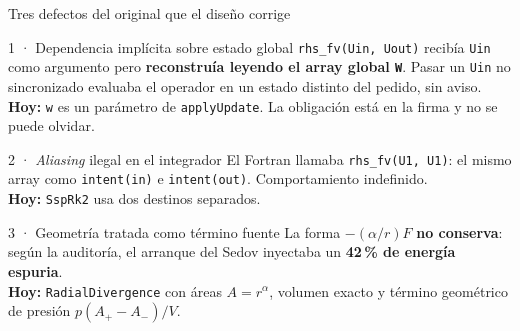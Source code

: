 \documentclass[aspectratio=169,10pt]{beamer}
\newcommand{\cod}[1]{\texttt{\small #1}}
\begin{document}
\begin{frame}[shrink]{Tres defectos del original que el diseño corrige}
  \small

  \begin{block}{1 · Dependencia implícita sobre estado global}
    \cod{rhs\_fv(Uin, Uout)} recibía \cod{Uin} como argumento pero
    \textbf{reconstruía leyendo el array global \cod{W}}. Pasar un \cod{Uin} no
    sincronizado evaluaba el operador en un estado distinto del pedido, sin aviso.
    \\[2pt]
    \textbf{Hoy:} \cod{w} es un parámetro de \cod{applyUpdate}. La obligación está
    en la firma y no se puede olvidar.
  \end{block}

  \begin{block}{2 · \emph{Aliasing} ilegal en el integrador}
    El Fortran llamaba \cod{rhs\_fv(U1, U1)}: el mismo array como \cod{intent(in)}
    e \cod{intent(out)}. Comportamiento indefinido.
    \\[2pt]
    \textbf{Hoy:} \cod{SspRk2} usa dos destinos separados.
  \end{block}

  \begin{block}{3 · Geometría tratada como término fuente}
    La forma $-(\alpha/r)F$ \textbf{no conserva}: según la auditoría, el arranque
    del Sedov inyectaba un \textbf{42\,\% de energía espuria}.
    \\[2pt]
    \textbf{Hoy:} \cod{RadialDivergence} con áreas $A=r^{\alpha}$, volumen exacto
    y término geométrico de presión $p(A_+-A_-)/V$.
  \end{block}
\end{frame}
\end{document}
